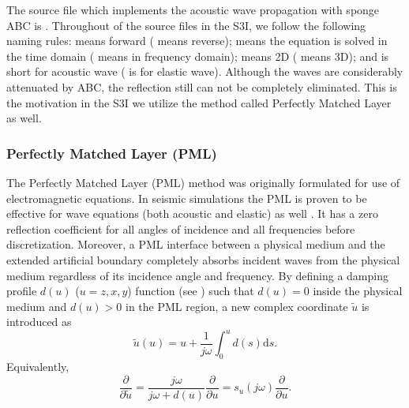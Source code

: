\documentclass[11pt,titlepage]{article}
\theoremstyle{plain}
\theoremstyle{definition}
\theoremstyle{remark}
\numberwithin{equation}{section}
\begin{document}
The source file which implements the acoustic wave propagation with sponge ABC is . Throughout of the source files in the S3I,  we follow the following naming rules:  means forward ( means reverse);  means the equation is solved in the time domain ( means in frequency domain);  means 2D ( means 3D); and  is short for acoustic wave ( is for elastic wave).  Although the waves are considerably attenuated by ABC, the reflection still can not be completely eliminated. This is the motivation in the S3I we utilize the method called Perfectly Matched Layer as well.


\subsubsection{Perfectly Matched Layer (PML)}
The Perfectly Matched Layer (PML) method was originally formulated for use of electromagnetic equations. In seismic simulations the PML is proven to be effective for wave equations (both acoustic and elastic) as well \cite{Komatitsch:2007aa}. It has a zero reflection coefficient for all angles of incidence and all frequencies before discretization. Moreover, a PML interface between a physical medium and the extended artificial boundary completely absorbs incident waves from the physical medium regardless of its incidence angle and frequency. By defining a damping profile $d(u)$ ($u=z, x, y$) function (see ) such that $d(u) = 0$ inside the physical medium and $d(u) > 0$ in the PML region, a new complex coordinate $\tilde{u}$ is introduced as
  \begin{equation}
  \label{eq:replace}
  \tilde{u}(u) = u + \frac{1}{j\omega}\int_0^u d(s)\mathrm{d}s.
  \end{equation}
Equivalently,
  \begin{equation}
  \frac{\partial}{\partial \tilde{u}} = \frac{j\omega}{j\omega + d(u)}\frac{\partial}{\partial u} = s_u(j\omega)\frac{\partial}{\partial u}.
  \end{equation} 
  
\end{document}
